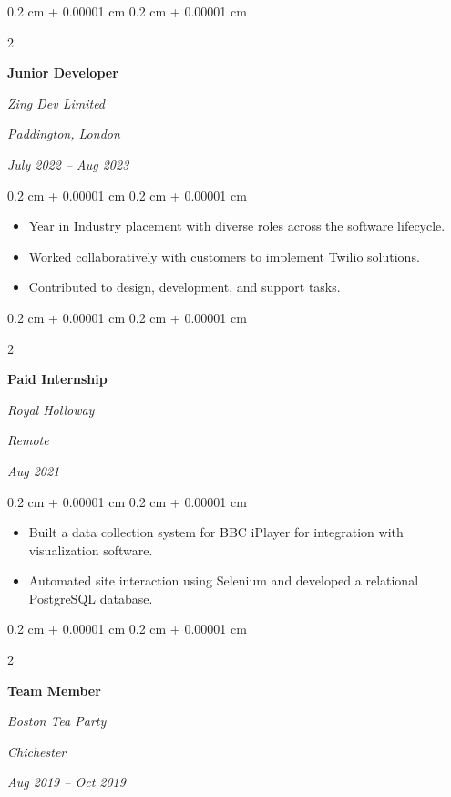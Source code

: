 \documentclass[10pt, a4paper]{article}
\newenvironment{highlights}{
    \begin{itemize}[
        topsep=0.10 cm,
        parsep=0.10 cm,
        partopsep=0pt,
        itemsep=0pt,
        leftmargin=0.4 cm + 10pt
    ]
}{
    \end{itemize}
} %
\newenvironment{onecolentry}{
    \begin{adjustwidth}{
        0.2 cm + 0.00001 cm
    }{
        0.2 cm + 0.00001 cm
    }
}{
    \end{adjustwidth}
} %
\newenvironment{twocolentry}[2][]{
    \onecolentry
    \def\secondColumn{#2}
    \setcolumnwidth{\fill, 4.5 cm}
    \begin{paracol}{2}
}{
    \switchcolumn \raggedleft \secondColumn
    \end{paracol}
    \endonecolentry
} %
\begin{document}
        \vspace{0.2 cm}

        \begin{twocolentry}{
        \textit{Paddington, London}    
            
        \textit{July 2022 – Aug 2023}}
            \textbf{Junior Developer}
            
            \textit{Zing Dev Limited}
        \end{twocolentry}

        \vspace{0.10 cm}
        \begin{onecolentry}
            \begin{highlights}
                \item Year in Industry placement with diverse roles across the software lifecycle.
                \item Worked collaboratively with customers to implement Twilio solutions.
                \item Contributed to design, development, and support tasks.
            \end{highlights}
        \end{onecolentry}


        \vspace{0.2 cm}
        \newpage
        \begin{twocolentry}{
        \textit{Remote}    
            
        \textit{Aug 2021}}
            \textbf{Paid Internship}
            
            \textit{Royal Holloway}
        \end{twocolentry}

        \vspace{0.10 cm}
        \begin{onecolentry}
            \begin{highlights}
                \item Built a data collection system for BBC iPlayer for integration with visualization software.
                \item Automated site interaction using Selenium and developed a relational PostgreSQL database.
            \end{highlights}
        \end{onecolentry}


        \vspace{0.2 cm}

        \begin{twocolentry}{
        \textit{Chichester}    
            
        \textit{Aug 2019 – Oct 2019}}
            \textbf{Team Member}
            
            \textit{Boston Tea Party}
        \end{twocolentry}
\end{document}
